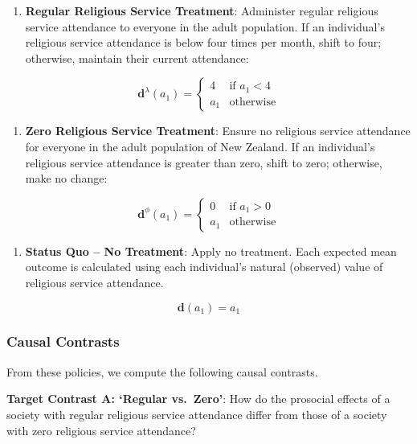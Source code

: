 \documentclass[
  single column]{article}
\providecommand{\tightlist}{%
  \setlength{\itemsep}{0pt}\setlength{\parskip}{0pt}}\usepackage{longtable,booktabs,array}
\begin{document}
\begin{enumerate}
\def\labelenumi{\arabic{enumi}.}
\tightlist
\item
  \textbf{Regular Religious Service Treatment}: Administer regular
  religious service attendance to everyone in the adult population. If
  an individual's religious service attendance is below four times per
  month, shift to four; otherwise, maintain their current attendance:
\end{enumerate}

\[
\mathbf{d}^\lambda (a_1) = \begin{cases} 4 & \text{if } a_1 < 4 \\ 
a_1 & \text{otherwise} \end{cases}
\]

\begin{enumerate}
\def\labelenumi{\arabic{enumi}.}
\setcounter{enumi}{1}
\tightlist
\item
  \textbf{Zero Religious Service Treatment}: Ensure no religious service
  attendance for everyone in the adult population of New Zealand. If an
  individual's religious service attendance is greater than zero, shift
  to zero; otherwise, make no change:
\end{enumerate}

\[
\mathbf{d}^\phi (a_1) = \begin{cases} 0 & \text{if } a_1 > 0 \\ 
a_1 & \text{otherwise} \end{cases}
\]

\begin{enumerate}
\def\labelenumi{\arabic{enumi}.}
\setcounter{enumi}{2}
\tightlist
\item
  \textbf{Status Quo -- No Treatment}: Apply no treatment. Each expected
  mean outcome is calculated using each individual's natural (observed)
  value of religious service attendance.
\end{enumerate}

\[
\mathbf{d}(a_1) = a_1
\]

\subsubsection{Causal Contrasts}\label{causal-contrasts}

From these policies, we compute the following causal contrasts.

\textbf{Target Contrast A: `Regular vs.~Zero'}: How do the prosocial
effects of a society with regular religious service attendance differ
from those of a society with zero religious service attendance?
\end{document}
